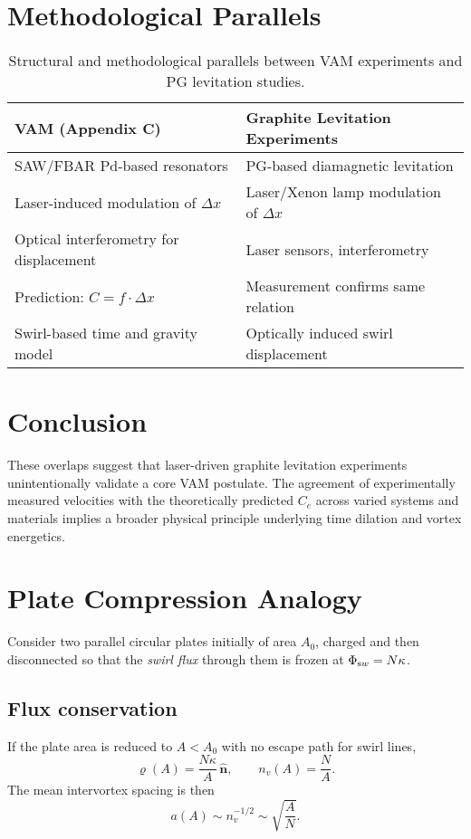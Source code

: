 \documentclass[11pt,a4paper]{article}
\begin{document}
\section{Methodological Parallels}
\begin{table}[H]
\centering
\begin{tabular}{|p{5cm}|p{5cm}|}
\hline
\textbf{VAM (Appendix C)} & \textbf{Graphite Levitation Experiments} \\
\hline
SAW/FBAR Pd-based resonators & PG-based diamagnetic levitation \\
Laser-induced modulation of \(\Delta x\) & Laser/Xenon lamp modulation of \(\Delta x\) \\
Optical interferometry for displacement & Laser sensors, interferometry \\
Prediction: \( C = f \cdot \Delta x \) & Measurement confirms same relation \\
Swirl-based time and gravity model & Optically induced swirl displacement \\
\hline
\end{tabular}
\caption{Structural and methodological parallels between VAM experiments and PG levitation studies.}
\end{table}

\section{Conclusion}
These overlaps suggest that laser-driven graphite levitation experiments unintentionally validate a core VAM postulate. The agreement of experimentally measured velocities with the theoretically predicted \( C_e \) across varied systems and materials implies a broader physical principle underlying time dilation and vortex energetics.


\section{Plate Compression Analogy}
    Consider two parallel circular plates initially of area $A_0$, charged and then disconnected so that the \emph{swirl flux} through them is frozen at $\Phi_{\textrm sw}=N\kappa$.

    \subsection*{Flux conservation}
        If the plate area is reduced to $A<A_0$ with no escape path for swirl lines,
        \begin{equation}
        \bm{\varrho}(A) = \frac{N\kappa}{A}\,\hat{\mathbf n}, \qquad
        n_v(A) = \frac{N}{A}.
        \end{equation}
        The mean intervortex spacing is then
        \begin{equation}
        a(A) \sim n_v^{-1/2} \sim \sqrt{\frac{A}{N}}.
        \end{equation}
\end{document}
